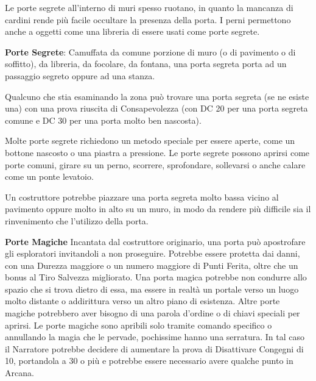 \begin{multicols}{2}
Le porte segrete all'interno di muri spesso ruotano, in quanto la mancanza di cardini rende più facile occultare la presenza della porta. I perni permettono anche a oggetti come una libreria di essere usati come porte segrete.

\textbf{Porte Segrete}: Camuffata da comune porzione di muro (o di pavimento o di soffitto), da libreria, da focolare, da fontana, una porta segreta porta ad un passaggio segreto oppure ad una stanza.

Qualcuno che stia esaminando la zona può trovare una porta segreta (se ne esiste una) con una prova riuscita di Consapevolezza (con DC 20 per una porta segreta comune e DC 30 per una porta molto ben nascosta).

Molte porte segrete richiedono un metodo speciale per essere aperte, come un bottone nascosto o una piastra a pressione. Le porte segrete possono aprirsi come porte comuni, girare su un perno, scorrere, sprofondare, sollevarsi o anche calare come un ponte levatoio.

Un costruttore potrebbe piazzare una porta segreta molto bassa vicino al pavimento oppure molto in alto su un muro, in modo da rendere più difficile sia il rinvenimento che l'utilizzo della porta.

\textbf{Porte Magiche} Incantata dal costruttore originario, una porta può apostrofare gli esploratori invitandoli a non proseguire. Potrebbe essere protetta dai danni, con una Durezza maggiore o un numero maggiore di Punti Ferita, oltre che un bonus al Tiro Salvezza migliorato. Una porta magica potrebbe non condurre allo spazio che si trova dietro di essa, ma essere in realtà un portale verso un luogo molto distante o addirittura verso un altro piano di esistenza. Altre porte magiche potrebbero aver bisogno di una parola d'ordine o di chiavi speciali per aprirsi.
Le porte magiche sono apribili solo tramite comando specifico o annullando la magia che le pervade, pochissime hanno una serratura.
In tal caso il Narratore potrebbe decidere di aumentare la prova di Disattivare Congegni di 10, portandola a 30 o più e potrebbe essere necessario avere qualche punto in Arcana.


\end{multicols}
